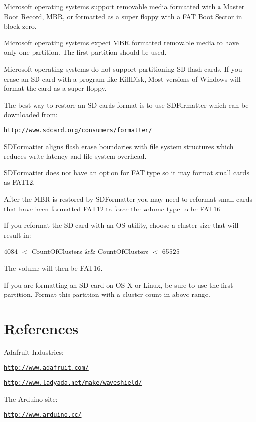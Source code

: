 Microsoft operating systems support removable media formatted with a Master Boot Record, M\+BR, or formatted as a super floppy with a F\+AT Boot Sector in block zero.

Microsoft operating systems expect M\+BR formatted removable media to have only one partition. The first partition should be used.

Microsoft operating systems do not support partitioning SD flash cards. If you erase an SD card with a program like Kill\+Disk, Most versions of Windows will format the card as a super floppy.

The best way to restore an SD card\textquotesingle{}s format is to use S\+D\+Formatter which can be downloaded from\+:

\href{http://www.sdcard.org/consumers/formatter/}{\tt http\+://www.\+sdcard.\+org/consumers/formatter/}

S\+D\+Formatter aligns flash erase boundaries with file system structures which reduces write latency and file system overhead.

S\+D\+Formatter does not have an option for F\+AT type so it may format small cards as F\+A\+T12.

After the M\+BR is restored by S\+D\+Formatter you may need to reformat small cards that have been formatted F\+A\+T12 to force the volume type to be F\+A\+T16.

If you reformat the SD card with an OS utility, choose a cluster size that will result in\+:

4084 $<$ Count\+Of\+Clusters \&\& Count\+Of\+Clusters $<$ 65525

The volume will then be F\+A\+T16.

If you are formatting an SD card on OS X or Linux, be sure to use the first partition. Format this partition with a cluster count in above range.\hypertarget{index_References}{}\section{References}\label{index_References}
Adafruit Industries\+:

\href{http://www.adafruit.com/}{\tt http\+://www.\+adafruit.\+com/}

\href{http://www.ladyada.net/make/waveshield/}{\tt http\+://www.\+ladyada.\+net/make/waveshield/}

The Arduino site\+:

\href{http://www.arduino.cc/}{\tt http\+://www.\+arduino.\+cc/}

